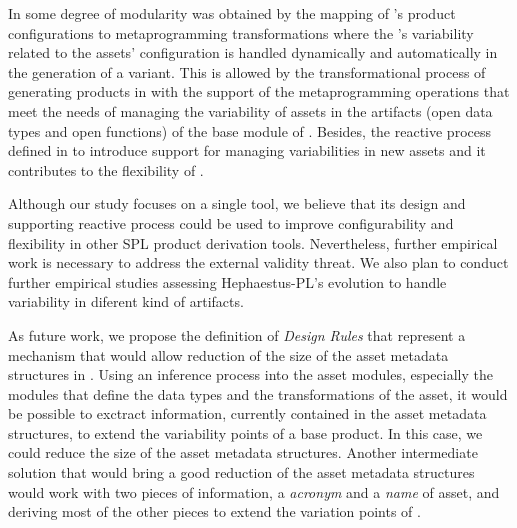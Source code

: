 In \hpl{} some degree of modularity was obtained by the mapping of \hpl's product configurations to metaprogramming transformations where the \hpl's variability related to the assets' configuration is handled dynamically and automatically in the generation of a \hpl{} variant. This is allowed by the transformational process of generating products in \hpl{} with the support of the metaprogramming operations that meet the needs of managing the variability of assets in the artifacts (open data types and open functions) of the base module of \hpl.
Besides, the reactive process defined in \hpl{} to introduce support for managing variabilities in new assets and it contributes to the flexibility of \hpl{}. 

Although our study focuses on a single tool, we believe that its design and supporting reactive process could be used to improve configurability and flexibility in other SPL product derivation tools.
Nevertheless, further empirical work is necessary to address the external validity threat. 
We also plan to conduct further empirical studies assessing Hephaestus-PL's evolution to handle variability in diferent kind of artifacts.

As future work, we propose the definition of \textit{Design Rules} that represent a mechanism that would allow reduction of the size of the asset metadata structures in \hpl. Using an inference process into the asset modules, especially the modules that define the data types and the transformations of the asset, it would be possible to exctract information, currently contained in the asset metadata structures, to extend the variability points of a \hpl{} base product. In this case, we could reduce the size of the asset metadata structures.
Another intermediate solution that would bring a good reduction of the asset metadata structures would work with two pieces of information, a \textit{acronym} and a \textit{name} of asset, and deriving most of the other pieces to extend the variation points of \hpl{}.
